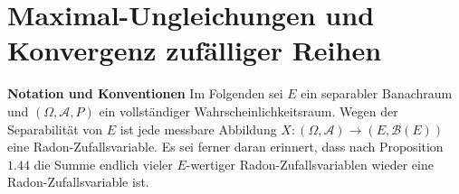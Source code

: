 \chapter{Maximal-Ungleichungen und Konvergenz zufälliger Reihen}
\textbf{Notation und Konventionen}\newline 
Im Folgenden sei $E$ ein separabler Banachraum und $(\Omega, \mathcal{A}, P)$ ein vollständiger Wahrscheinlichkeitsraum. Wegen der Separabilität von $E$ ist jede messbare Abbildung $X: (\Omega, \mathcal{A}) \to (E, \mathcal{B}(E))$ eine Radon-Zufallsvariable. 
Es sei ferner daran erinnert, dass nach Proposition $1.44$ die Summe endlich vieler $E$-wertiger Radon-Zufallsvariablen wieder eine Radon-Zufallsvariable ist. 

\newpage



